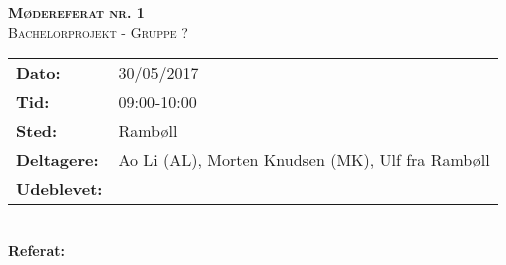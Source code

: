
\newcommand{\HRule}{\rule{\linewidth}{0.1mm}}


	\begin{center}
		{\huge \bfseries \textsc{Mødereferat nr. 1}}\\
		\textsc{\large Bachelorprojekt - Gruppe ?}\\[0.3cm]
	\end{center}
	\begin{tabular}{ll}
	\large \textbf{Dato:} & 30/05/2017  	\\ %
	\large \textbf{Tid:}  & 09:00-10:00 	\\ %
	\large \textbf{Sted:} & Rambøll		\\ %
	\large \textbf{Deltagere:} & Ao Li (AL), Morten Knudsen (MK), Ulf fra Rambøll \\
	\large \textbf{Udeblevet:}
	\end{tabular}\\
	\phantom{\,}\hspace{0.1em} \large \textbf{Referat:}
